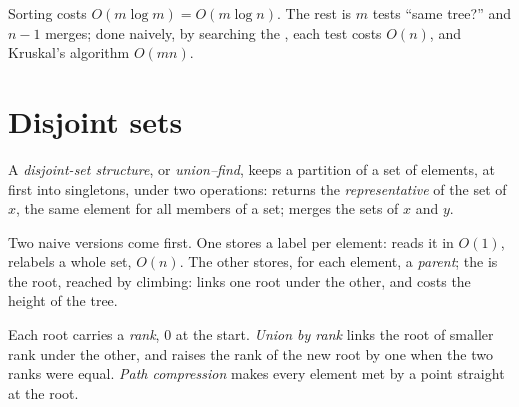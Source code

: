 Sorting costs $O(m \log m) = O(m \log n)$. The rest is $m$ tests ``same tree?'' and $n - 1$ merges; done naively, by
searching the , each test costs $O(n)$, and Kruskal's algorithm $O(mn)$.

\section{Disjoint sets}\label{sec:b1:spanning-trees:union-find}

\begin{definition}\label{def:b1:spanning-trees:union-find}
A \emph{disjoint-set structure}, or \emph{union--find}, keeps a
partition of a set of elements, at first into singletons, under two operations:  returns the
\emph{representative} of the set of $x$, the same element for all members of a set;
 merges the sets of $x$ and $y$.
\end{definition}

Two naive versions come first. One stores a label per element:  reads it in $O(1)$,  relabels a
whole set, $O(n)$. The other stores, for each element, a \emph{parent}; the  is the root, reached by
climbing:  links one root under the other, and  costs the height of the tree.

\label{lst:b1:spanning-trees:naive}

\label{out:b1:spanning-trees:naive}

\begin{definition}\label{def:b1:spanning-trees:rank}
Each root carries a \emph{rank}, 0 at the start. \emph{Union by rank}
links the root of smaller rank under the other, and raises the rank of the new root by one when the two ranks were
equal. \emph{Path compression} makes every element met by a  point straight at the
root.
\end{definition}

